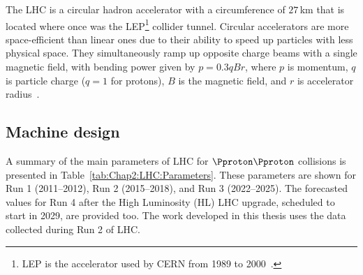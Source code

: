 The LHC is a circular hadron accelerator with a circumference of $27\,$km that is 
located where once was the LEP\footnote{LEP is the accelerator used 
by CERN from 1989 to 2000~\cite{Myers226776}.} collider tunnel.
Circular accelerators are more space-efficient than linear ones due to their ability to speed up 
particles with less physical space. They simultaneously ramp up opposite charge beams with 
a single magnetic field, with bending power given by $p=0.3qBr$, 
where $p$ is momentum, $q$ is particle charge ($q=1$ for protons), $B$ is the
magnetic field, and $r$ is accelerator radius~\cite{Wilson:2743947}.


\subsection{Machine design}

A summary of the main parameters of LHC for $\Pproton\Pproton$ collisions 
is presented in Table~\ref{tab:Chap2:LHC:Parameters}. These parameters are shown for 
Run 1 (2011--2012), Run 2 (2015--2018), and Run 3 (2022--2025).
The forecasted values for Run 4 after the High Luminosity (HL) LHC upgrade, scheduled to start in 2029, are provided too.
The work developed in this thesis uses the data collected during Run 2 of LHC.


